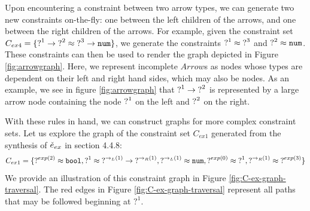 
Upon encountering a constraint between two arrow types, we can generate two new constraints on-the-fly: one between the left children of the arrows, and one between the right children of the arrows. For example, given the constraint set $C_{ex4} = \{ \mathtt{?}^1 \rightarrow \mathtt{?}^2 \approx \mathtt{?}^3 \rightarrow \mathtt{num} \}$, we generate the constraints $\mathtt{?}^1 \approx \mathtt{?}^3$ and $\mathtt{?}^2 \approx \mathtt{num}$. These constraints can then be used to render the graph depicted in Figure \ref{fig:arrowgraph}. Here, we represent incomplete $Arrow$s as nodes whose types are dependent on their left and right hand sides, which may also be nodes. As an example, we see in figure \ref{fig:arrowgraph} that $\mathtt{?}^1 \rightarrow \mathtt{?}^2$ is represented by a large arrow node containing the node $\mathtt{?}^1$ on the left and $\mathtt{?}^2$ on the right. 

With these rules in hand, we can construct graphs for more complex constraint sets. Let us explore the graph of the constraint set $C_{ex1}$ generated from the synthesis of $\check{e}_{ex}$ in section 4.4.8:
$$C_{ex1} = \{ \operatorname{?}^{exp(2)} \approx \mathtt{bool}, \operatorname{?}^1 \approx \operatorname{?}^{\rightarrow_L(1)} \rightarrow \operatorname{?}^{\rightarrow_R(1)},  \operatorname{?}^{\rightarrow_L(1)} \approx \mathtt{num}, \operatorname{?}^{exp(0)} \approx \operatorname{?}^{1}, \operatorname{?}^{\rightarrow_R(1)} \approx \operatorname{?}^{exp(3)} \}$$
We provide an illustration of this constraint graph in Figure \ref{fig:C-ex-graph-traversal}. The red edges in Figure \ref{fig:C-ex-graph-traversal} represent all paths that may be followed beginning at $?^1$. 

